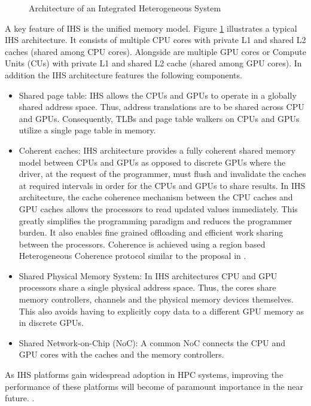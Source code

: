\begin{figure}[!htb]
	\centering
	\def\svgwidth{0.9\columnwidth}
	
	\caption{Architecture of an Integrated Heterogeneous System}
	\label{fig:hsa-arch}
\end{figure}
\par A key feature of IHS is the unified memory model.  Figure \ref{fig:hsa-arch} illustrates a typical IHS architecture. It consists of multiple CPU cores with private L1 and shared L2 caches (shared among CPU cores). Alongside are multiple GPU cores or Compute Units (CUs) with private L1 and shared L2 cache (shared among GPU cores). In addition the IHS architecture features the following components.
\begin{itemize}
	\item Shared page table: IHS allows the CPUs and GPUs to operate in a globally shared address space. Thus, address translations are to be shared across CPU and GPUs. Consequently, TLBs and page table walkers on CPUs and GPUs utilize a single page table in memory.
	\item Coherent caches: IHS architecture provides a fully coherent shared memory model between CPUs and GPUs as opposed to discrete GPUs where the driver, at the request of the programmer, must flush and invalidate the caches at required intervals in order for the CPUs and GPUs to share results. In IHS architecture, the cache coherence mechanism between the CPU caches and GPU caches allows the processors to read updated values immediately. This greatly simplifies the programming paradigm and reduces the programmer burden. It also enables fine grained offloading and efficient work sharing between the processors. Coherence is achieved using a region based Heterogeneous Coherence protocol similar to the proposal in \cite{hsc-coherence}.
	\item Shared Physical Memory System: In IHS architectures CPU and GPU processors share a single physical address space. Thus, the cores share memory controllers, channels and the physical memory devices themselves. This also avoids having to explicitly copy data to a different GPU memory as in discrete GPUs.
	\item Shared Network-on-Chip (NoC): A common NoC connects the CPU and GPU cores with the caches and the memory controllers.
\end{itemize}
As IHS platforms gain widespread adoption in HPC systems, improving the performance of these platforms will become of paramount importance in the near future. \cite{apu-exascale,amd-exascale1}. 

